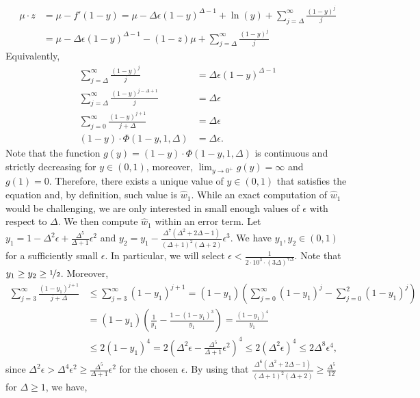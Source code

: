 \documentclass[11pt]{article}
\begin{document}
\begin{appendixproof}
\begin{align*}
\mu \cdot z & = \mu - f'(1-y) = \mu - \Delta\epsilon(1-y)^{\Delta-1} + \ln(y) + \sum_{j=\Delta}^\infty \frac{(1-y)^j}j\\
& = \mu - \Delta\epsilon(1-y)^{\Delta-1} - (1-z)\mu + \sum_{j=\Delta}^\infty \frac{(1-y)^j}j
\end{align*}
Equivalently,
\begin{align*}
\sum_{j=\Delta}^\infty \frac{(1-y)^j}{j} &= \Delta\epsilon(1-y)^{\Delta-1} \\
\sum_{j=\Delta}^\infty \frac{(1-y)^{j-\Delta+1}}{j} &= \Delta\epsilon\\
\sum_{j=0}^\infty \frac{(1-y)^{j+1}}{j+\Delta} & = \Delta\epsilon\\
(1-y)\cdot \Phi(1-y, 1, \Delta) & = \Delta\epsilon.
\end{align*}
Note that the function $g(y)=(1-y)\cdot \Phi(1-y, 1, \Delta)$ is continuous and strictly decreasing for $y\in(0,1)$, moreover, $\lim_{y \rightarrow 0^+} g(y) = \infty$ and $g(1) = 0$. Therefore, there exists a unique value of $y\in(0,1)$ that satisfies the equation and, by definition, such value is $\hat{w}_1$. While an exact computation of $\hat{w}_1$ would be challenging, we are only interested  in small enough values of $\epsilon$ with respect to $\Delta$. We then compute $\hat{w}_1$ within an error term. Let $y_1=1-\Delta^2\epsilon + \frac{\Delta^5}{\Delta+1}\epsilon^2$ and $y_2 = y_1 - \frac{\Delta^7(\Delta^2+2\Delta-1)}{(\Delta+1)^2(\Delta+2)} \epsilon^3$. We have $y_1,y_2\in(0,1)$ for a sufficiently small $\epsilon$. In particular, we will select $\epsilon < \frac{1}{2\cdot 10^3 \cdot (3\Delta)^{7\Delta}}$. Note that $y_1 \geq y_2 \geq \nicefrac12$. Moreover,
\begin{align*}
    \sum_{j=3}^\infty \frac{(1-y_1)^{j+1}}{j+\Delta} & \leq \sum_{j=3}^\infty (1-y_1)^{j+1} = (1-y_1) \left(\sum_{j=0}^\infty (1-y_1)^j - \sum_{j=0}^2 (1-y_1)^j\right)\\
    & = (1-y_1) \left(\frac{1}{y_1} - \frac{1-(1-y_1)^3}{y_1}\right) = \frac{(1-y_1)^4}{y_1}\\
    & \leq 2(1-y_1)^4 = 2\left(\Delta^2\epsilon - \frac{\Delta^5}{\Delta+1} \epsilon^2\right)^4 \le 2\left(\Delta^2\epsilon\right)^4 \le 2\Delta^8  \epsilon^4,
\end{align*}
since $\Delta^2 \epsilon > \Delta^{4} \epsilon^2 \ge \frac{\Delta^5}{\Delta+1} \epsilon^2$ for the chosen $\epsilon$. By using that $\frac{\Delta^6(\Delta^2 + 2\Delta-1)}{(\Delta+1)^2(\Delta+2)} \geq \frac{\Delta^5}{12}$ for $\Delta\geq 1$, we have,

\end{appendixproof}
\end{document}
